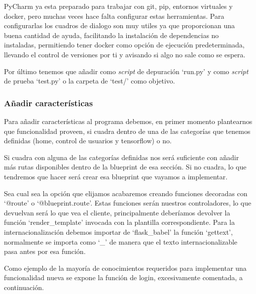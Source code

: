PyCharm ya esta preparado para trabajar con git, pip, entornos virtuales y docker, pero muchas veces hace falta configurar estas herramientas. Para configurarlas los cuadros de dialogo son muy utiles ya que proporcionan una buena cantidad de ayuda, facilitando la instalación de dependencias no instaladas, permitiendo tener docker como opción de ejecución predeterminada, llevando el control de versiones por ti y avisando si algo no sale como se espera.

Por último tenemos que añadir como \emph{script} de depuración `run.py' y como \emph{script} de prueba `test.py' o la carpeta de `test/' como objetivo.

\subsubsection{Añadir características}

Para añadir características al programa debemos, en primer momento plantearnos que funcionalidad proveen, si cuadra dentro de una de las categorías que tenemos definidas (home, control de usuarios y tensorflow) o no. 

Si cuadra con alguna de las categorías definidas nos será suficiente con añadir más rutas disponibles dentro de la blueprint de esa sección. Si no cuadra, lo que tendremos que hacer será crear esa blueprint que vayamos a implementar. 

Sea cual sea la opción que elijamos acabaremos creando funciones decoradas con `@route' o `@blueprint.route'. Estas funciones serán nuestros controladores, lo que devuelvan será lo que vea el cliente, principalmente deberíamos devolver la función `render\_template' invocada con la plantilla correspondiente. Para la internacionalización debemos importar de `flask\_babel' la función `gettext', normalmente se importa como `\_' de manera que el texto internacionalizable pasa antes por esa función.

Como ejemplo de la mayoría de conocimientos requeridos para implementar una funcionalidad nueva se expone la función de login, excesivamente comentada, a continuación.

